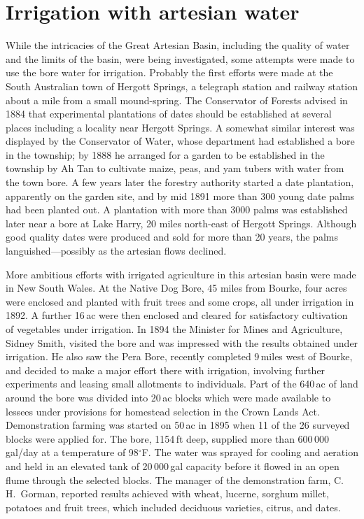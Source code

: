 \section*{Irrigation with artesian water}

While the intricacies of the Great Artesian Basin, including the
quality of water and the limits of the basin, were being investigated,
some attempts were made to use the bore water for irrigation.
Probably the first efforts were made at the South Australian town of
Hergott Springs, a telegraph station and railway station about a mile
from a small mound-spring.  The Conservator of Forests advised in 1884
that experimental plantations of dates should be established at
several places including a locality near Hergott Springs.  A somewhat
similar interest was displayed by the Conservator of Water, whose
department had established a bore in the township; by 1888 he arranged
for a garden to be established in the township by Ah Tan to cultivate
maize, peas, and yam tubers with water from the town bore.  A few
years later the forestry authority started a date plantation,
apparently on the garden site, and by mid 1891 more than 300 young
date palms had been planted out.  A plantation with more than 3000
palms was established later near a bore at Lake Harry, 20 miles
north-east of Hergott Springs. Although good quality dates were
produced and sold for more than 20 years, the palms
languished---possibly as the artesian flows
declined.

More ambitious efforts with irrigated agriculture in this artesian
basin were made in New South Wales.  At the Native Dog Bore, 45 miles
from Bourke, four acres were enclosed and planted with fruit trees and
some crops, all under irrigation in 1892.  A further 16\,ac were then
enclosed and cleared for satisfactory cultivation of vegetables under
irrigation.  In 1894 the Minister for Mines and Agriculture, Sidney
Smith, visited the bore and was impressed with the results obtained
under irrigation.  He also saw the Pera Bore, recently completed
9\,miles west of Bourke, and decided to make a major effort there with
irrigation, involving further experiments and leasing small allotments
to individuals.  Part of the 640\,ac of land around the bore was
divided into 20\,ac blocks which were made available to lessees under
provisions for homestead selection in the Crown Lands
Act. Demonstration farming was started on 50\,ac in 1895 when 11 of
the 26 surveyed blocks were applied for. The bore, 1154\,ft deep,
supplied more than 600\,000\,gal/day at a temperature of 98$^\circ$F.
The water was sprayed for cooling and aeration and held in an elevated
tank of 20\,000\,gal capacity before it flowed in an open flume
through the selected blocks.  The manager of the demonstration farm,
C.\,H.~Gorman, reported results achieved with wheat, lucerne, sorghum
millet, potatoes and fruit trees, which included deciduous varieties,
citrus, and dates.

